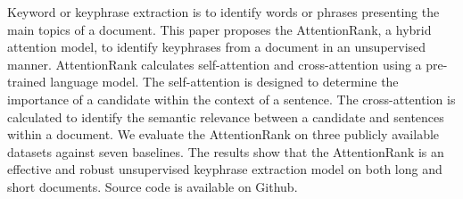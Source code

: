 Keyword or keyphrase extraction is to identify words or phrases presenting the main topics of a document. This paper proposes the AttentionRank, a hybrid attention model, to identify keyphrases from a document in an unsupervised manner.  AttentionRank calculates self-attention and cross-attention using a pre-trained language model. The self-attention is designed to determine the importance of a candidate within the context of a sentence. The cross-attention is calculated to identify the semantic relevance between a candidate and sentences within a document. We evaluate the AttentionRank on three publicly available datasets against seven baselines. The results show that the AttentionRank is an effective and robust unsupervised keyphrase extraction model on both long and short documents. Source code is available on Github.
